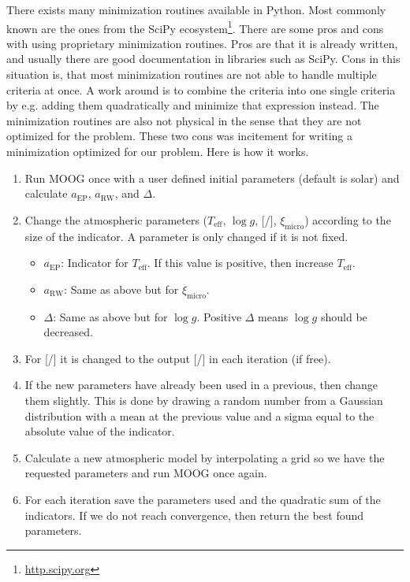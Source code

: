 \documentclass{aa}
\begin{document}
There exists many minimization routines available in Python. Most commonly
known are the ones from the SciPy ecosystem\footnote{\url{http.scipy.org}}.
There are some pros and cons with using proprietary minimization routines.
Pros are that it is already written, and usually there are good documentation
in libraries such as SciPy. Cons in this situation is, that most minimization
routines are not able to handle multiple criteria at once. A work around is
to combine the criteria into one single criteria by e.g. adding them
quadratically and minimize that expression instead. The minimization routines
are also not physical in the sense that they are not optimized for the problem.
These two cons was incitement for writing a minimization optimized for our
problem. Here is how it works.

\begin{enumerate}
    \item Run MOOG once with a user defined initial parameters (default is
          solar) and calculate $a_\mathrm{EP}$, $a_\mathrm{RW}$, and
          $\Delta$.
    \item Change the atmospheric parameters ($T_\mathrm{eff}$, $\log g$,
          [/], $\xi_\mathrm{micro}$) according to the size of the
          indicator. A parameter is only changed if it is not fixed.
    \begin{itemize}
        \item $a_\mathrm{EP}$: Indicator for $T_\mathrm{eff}$. If this value
              is positive, then increase $T_\mathrm{eff}$.
        \item $a_\mathrm{RW}$: Same as above but for $\xi_\mathrm{micro}$.
        \item $\Delta$: Same as above but for $\log g$. Positive
              $\Delta$ means $\log g$ should be decreased.
    \end{itemize}
    \item For [/] it is changed to the output [/]
          in each iteration (if free).
    \item If the new parameters have already been used in a previous, then
          change them slightly. This is done by drawing a random number from
          a Gaussian distribution with a mean at the previous value and a sigma
          equal to the absolute value of the indicator.
    \item Calculate a new atmospheric model by interpolating a grid so we have
          the requested parameters and run MOOG once again.
    \item For each iteration save the parameters used and the quadratic sum of
          the indicators. If we do not reach convergence, then return the best
          found parameters.
\end{enumerate}
\end{document}
